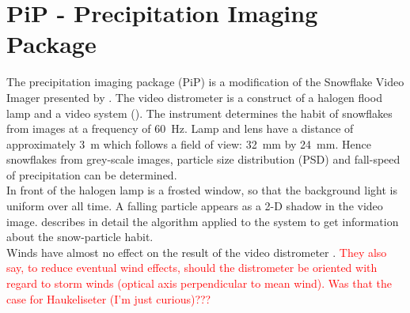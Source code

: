 \section{PiP - Precipitation Imaging Package}

The precipitation imaging package (PiP) is a modification of the Snowflake Video Imager presented by \cite{newman_presenting_2009}. The video distrometer is a construct of a halogen flood lamp and a video system (). The instrument determines the habit of snowflakes from images at a frequency of \SI{60}{\Hz}. Lamp and lens have a distance of approximately \SI{3}{\metre} which follows a field of view: \SI{32}{\mm} by \SI{24}{\mm}. Hence snowflakes from grey-scale images, particle size distribution (PSD) and fall-speed of precipitation can be determined. 
\\
In front of the halogen lamp is a frosted window, so that the background light is uniform over all time. A falling particle appears as a 2-D shadow in the video image. \cite{newman_presenting_2009} describes in detail the algorithm applied to the system to get information about the snow-particle habit. \\
Winds have almost no effect on the result of the video distrometer \citep{newman_presenting_2009}. \textcolor{red}{They also say, to reduce eventual wind effects, should the distrometer be oriented with regard to storm winds (optical axis perpendicular to mean wind). Was that the case for Haukeliseter (I'm just curious)???}

\newpage
